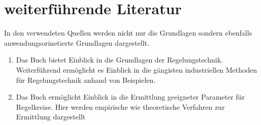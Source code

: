 \section{weiterführende Literatur}
In den verwendeten Quellen werden nicht nur die Grundlagen sondern ebenfalls anwendungsorinetierte Grundlagen dargestellt.

\begin{center}
	\begin{enumerate}
		\item Das Buch \cite{Lunze:2020} bietet Einblick in die Grundlagen der Regelungstechnik. Weiterführend ermöglicht es Einblick in die gängisten industriellen Methoden für Regelungstechnik anhand von Beispielen.  
		\item  Das Buch \cite{Loose:2026} ermöglicht Einblick in die Ermittlung geeigneter Parameter für Regelkreise. Hier werden empirische wie theoretische Verfahren zur Ermittlung dargestellt
	\end{enumerate}
\end{center}
